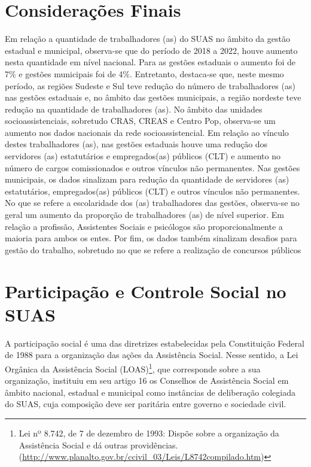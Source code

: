 \documentclass[
  brazilian]{report}
\begin{document}
\hypertarget{considerauxe7uxf5es-finais-3}{%
\chapter{Considerações Finais}\label{considerauxe7uxf5es-finais-3}}

Em relação a quantidade de trabalhadores (as) do SUAS no âmbito da
gestão estadual e municipal, observa-se que do período de 2018 a 2022,
houve aumento nesta quantidade em nível nacional. Para as gestões
estaduais o aumento foi de 7\% e gestões municipais foi de 4\%.
Entretanto, destaca-se que, neste mesmo período, as regiões Sudeste e
Sul teve redução do número de trabalhadores (as) nas gestões estaduais
e, no âmbito das gestões municipais, a região nordeste teve redução na
quantidade de trabalhadores (as). No âmbito das unidades
socioassistenciais, sobretudo CRAS, CREAS e Centro Pop, observa-se um
aumento nos dados nacionais da rede socioassistencial. Em relação ao
vínculo destes trabalhadores (as), nas gestões estaduais houve uma
redução dos servidores (as) estatutários e empregados(as) públicos (CLT)
e aumento no número de cargos comissionados e outros vínculos não
permanentes. Nas gestões municipais, os dados sinalizam para redução da
quantidade de servidores (as) estatutários, empregados(as) públicos
(CLT) e outros vínculos não permanentes. No que se refere a escolaridade
dos (as) trabalhadores das gestões, observa-se no geral um aumento da
proporção de trabalhadores (as) de nível superior. Em relação a
profissão, Assistentes Sociais e psicólogos são proporcionalmente a
maioria para ambos os entes. Por fim, os dados também sinalizam desafios
para gestão do trabalho, sobretudo no que se refere a realização de
concursos públicos

\hypertarget{participauxe7uxe3o-e-controle-social-no-suas}{%
\chapter{Participação e Controle Social no
SUAS}\label{participauxe7uxe3o-e-controle-social-no-suas}}

A participação social é uma das diretrizes estabelecidas pela
Constituição Federal de 1988 para a organização das ações da Assistência
Social. Nesse sentido, a Lei Orgânica da Assistência Social
(LOAS)\footnote{Lei nº 8.742, de 7 de dezembro de 1993: Dispõe sobre a organização da Assistência Social e dá outras providências. (\url{http://www.planalto.gov.br/ccivil_03/Leis/L8742compilado.htm})},
que corresponde sobre a sua organização, instituiu em seu artigo 16 os
Conselhos de Assistência Social em âmbito nacional, estadual e municipal
como instâncias de deliberação colegiada do SUAS, cuja composição deve
ser paritária entre governo e sociedade civil.
\end{document}
